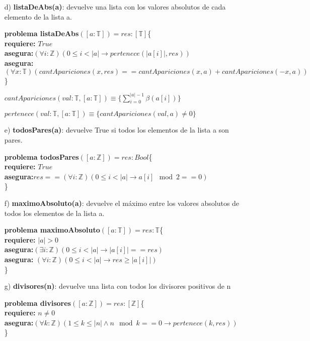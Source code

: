 \documentclass[10pt,a4paper]{article}
\begin{document}
\begin{enumerate}
\item[d)]\textbf{listaDeAbs(a)}: devuelve una lista con los valores absolutos de cada elemento de la lista a.

\textbf{problema listaDeAbs}$([a : \mathbb{T}])=res:[\mathbb{T}]$\{ \\
	\textbf{  requiere:} $True$\\
	\textbf{asegura:}$(\forall i:\mathbb{Z})(0\leq i<|a|\rightarrow pertenece(|a[i]|,res))$\\
	\textbf{asegura:}$(\forall x:\mathbb{T})(cantApariciones(x,res)== cantApariciones(x,a)+ cantApariciones(-x,a))$\\
	\}
	
	$cantApariciones(val:\mathbb{T},[a:\mathbb{T}])\equiv \{\sum^{|a|-1}_{i=0}\beta(a[i]) \} $
	
	$pertenece(val:\mathbb{T},[a:\mathbb{T}])\equiv \{cantApariciones(val,a)\not = 0 \} $
	
\item[e)]\textbf{todosPares(a)}: devuelve True si todos los elementos de la lista a son pares.

\textbf{problema todosPares}$([a : \mathbb{Z}])=res:Bool$\{ \\
	\textbf{  requiere:} $True$\\
	\textbf{  asegura:}$res==(\forall i:\mathbb{Z})(0\leq i<|a|\rightarrow a[i]\mod 2 == 0)$\\
	\}
\item[f)]\textbf{maximoAbsoluto(a)}: devuelve el máximo entre los valores absolutos de todos los elementos de la lista a.

\textbf{problema maximoAbsoluto}$([a : \mathbb{T}])=res:\mathbb{T}$\{ \\
	\textbf{  requiere:} $|a|>0$\\
	\textbf{  asegura:}$(\exists i:\mathbb{Z})(0\leq i<|a|\rightarrow |a[i]|== res)$\\
	\textbf{asegura:} $(\forall i:\mathbb{Z})(0\leq i<|a| \rightarrow res\geq |a[i]|)$\\
	\}
	
\item[g)]\textbf{divisores(n)}: devuelve una lista con todos los divisores positivos de n

\textbf{problema divisores}$([a : \mathbb{Z}])=res:[\mathbb{Z}]$\{ \\
	\textbf{  requiere:} $n\not = 0$\\
	\textbf{asegura:}$(\forall k:\mathbb{Z})(1\leq k\leq |n| \wedge n \mod k ==0 \rightarrow pertenece(k,res))$\\
	\}
	

\end{enumerate}
\end{document}
